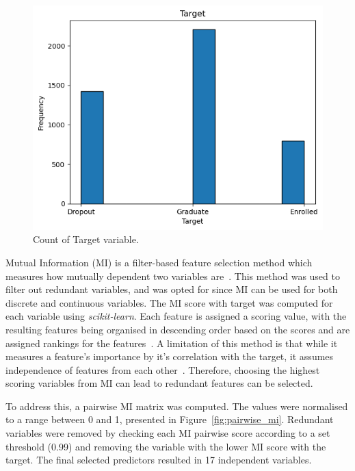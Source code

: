 \documentclass[12pt]{article}
\begin{document}
\begin{figure} [H]
    \centering
    \includegraphics[width=0.8\linewidth]{target_plot}
    \caption{Count of Target variable.}\label{fig:target}
  \end{figure}  

Mutual Information (MI) is a filter-based feature selection method which measures how mutually dependent two variables are~\cite{VenkateshAnuradha2019}. This method was used to filter out redundant variables, and was opted for since MI can be used for both discrete and continuous variables. The MI score with target was computed for each variable using \textit{scikit-learn}. Each feature is assigned a scoring value, with the resulting features being organised in descending order based on the scores and are assigned rankings for the features~\cite{VenkateshAnuradha2019}. A limitation of this method is that while it measures a feature's importance by it's correlation with the target, it assumes independence of features from each other~\cite{Li2017}. Therefore, choosing the highest scoring variables from MI can lead to redundant features can be selected.

To address this, a pairwise MI matrix was computed. The values were normalised to a range between 0 and 1, presented in Figure~\ref{fig:pairwise_mi}. Redundant variables were removed by checking each MI pairwise score according to a set threshold (0.99) and removing the variable with the lower MI score with the target. The final selected predictors resulted in 17 independent variables.
\end{document}

